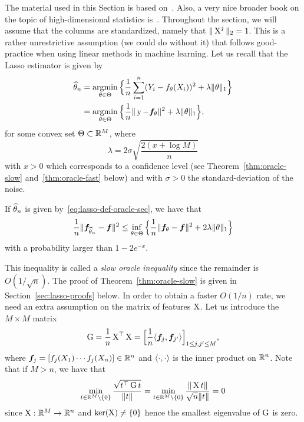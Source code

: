 The material used in this Section is based on~.
Also, a very nice broader book on the topic of high-dimensional statistics is~\cite{giraud2014introduction}.
Throughout the section, we will assume that the columns are standardized, namely that $\| \operatorname{{\boldsymbol X}}^j \|_2 = 1$.
This is a rather unrestrictive assumption (we could do without it) that follows good-practice when using linear methods in machine learning.
Let us recall that the Lasso estimator is given by
\begin{equation}
	\label{eq:lasso-def-oracle-sec}
	\begin{split}
	\widehat \theta_n &= \operatorname*{argmin}_{\theta \in \Theta} \Big\{ \frac 1n \sum_{i=1}^n (Y_i - f_\theta(X_i))^2 + \lambda \| \theta \|_1 \Big\} \\
	&= \operatorname*{argmin}_{\theta \in \Theta} \Big\{ 
	\frac 1n \| \operatorname{{\boldsymbol y}} - {\boldsymbol f}_\theta \|^2 + \lambda \| \theta \|_1 
	\Big\},
	\end{split}
\end{equation}
for some convex set $\Theta \subset \mathbb R^M$, where 
\begin{equation*}
	\lambda = 2 \sigma \sqrt{\frac{2(x + \log M)}{n}}
\end{equation*}
with $x > 0$ which corresponds to a confidence level (see Theorem~\ref{thm:oracle-slow} and~\ref{thm:oracle-fast} below) and with $\sigma > 0$ the standard-deviation of the noise.
\begin{theorem}
	\label{thm:oracle-slow}
	If $\widehat \theta_n$ is given by~\eqref{eq:lasso-def-oracle-sec}, we have that
	\begin{equation*}
		\frac 1n \| {\boldsymbol f}_{\widehat \theta_n} - {\boldsymbol f} \|^2 \leq \inf_{\theta \in \Theta} 
		\Big\{ \frac 1n \| {\boldsymbol f}_{\theta} - {\boldsymbol f} \|^2  + 2 \lambda \| \theta \|_1 \Big\}
	\end{equation*}
	with a probability larger than $1 - 2 e^{-x}$.
\end{theorem}
This inequality is called a \emph{slow oracle inequality} since the remainder is $O(1 / \sqrt{n})$.
The proof of Theorem~\ref{thm:oracle-slow} is given in Section~\ref{sec:lasso-proofs} below.
In order to obtain a faster $O(1 / n)$ rate, we need an extra assumption on the matrix of features $\operatorname{{\boldsymbol X}}$.
Let us introduce the $M \times M$ matrix 
\begin{equation*}
	\operatorname{{\boldsymbol G}} = \frac 1n \operatorname{{\boldsymbol X}}^\top \operatorname{{\boldsymbol X}} = 
	\Big[ \frac 1n \langle {\boldsymbol f}_j, {\boldsymbol f}_{j'} \rangle \Big]_{1 \leq j, j' \leq M},
\end{equation*}
where ${\boldsymbol f}_j = [f_j(X_1) \cdots f_j(X_n)] \in \mathbb R^n$ and $\langle \cdot, \cdot \rangle$ is the inner product on $\mathbb R^n$.
Note that if $M > n$, we have that
\begin{equation*}
	\min_{t \in \mathbb R^M \setminus \{ 0 \}} \frac{\sqrt{t^\top \operatorname{{\boldsymbol G}} t}}{\| t \|} 
	= \min_{t \in \mathbb R^M \setminus \{ 0 \}} \frac{\| \operatorname{{\boldsymbol X}} t \|}{\sqrt n \| t \|} = 0
\end{equation*}
since $\operatorname{{\boldsymbol X}} : \mathbb R^M \rightarrow \mathbb R^n$ and $\ker(\operatorname{{\boldsymbol X}}) \neq \{ 0 \}$ hence the smallest eigenvalue of $\operatorname{{\boldsymbol G}}$ is zero.

